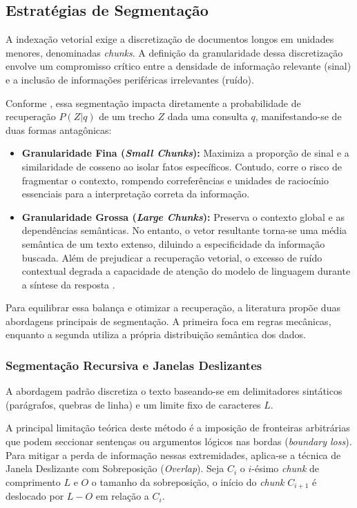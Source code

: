 \subsection{Estratégias de Segmentação}

A indexação vetorial exige a discretização de documentos longos em unidades menores, denominadas \textit{chunks}. A definição da granularidade dessa discretização envolve um compromisso crítico entre a densidade de informação relevante (sinal) e a inclusão de informações periféricas irrelevantes (ruído).

Conforme \citet{zhang2024_chunking}, essa segmentação impacta diretamente a probabilidade de recuperação $P(Z|q)$ de um trecho $Z$ dada uma consulta $q$, manifestando-se de duas formas antagônicas:

\begin{itemize}
  \item \textbf{Granularidade Fina (\textit{Small Chunks}):} Maximiza a proporção de sinal e a similaridade de cosseno ao isolar fatos específicos. Contudo, corre o risco de fragmentar o contexto, rompendo correferências e unidades de raciocínio essenciais para a interpretação correta da informação.
  \item \textbf{Granularidade Grossa (\textit{Large Chunks}):} Preserva o contexto global e as dependências semânticas. No entanto, o vetor resultante torna-se uma média semântica de um texto extenso, diluindo a especificidade da informação buscada. Além de prejudicar a recuperação vetorial, o excesso de ruído contextual degrada a capacidade de atenção do modelo de linguagem durante a síntese da resposta \citep{liu2023lostmiddlelanguagemodels}.
\end{itemize}

Para equilibrar essa balança e otimizar a recuperação, a literatura propõe duas abordagens principais de segmentação. A primeira foca em regras mecânicas, enquanto a segunda utiliza a própria distribuição semântica dos dados.
\subsubsection{Segmentação Recursiva e Janelas Deslizantes}

A abordagem padrão discretiza o texto baseando-se em delimitadores sintáticos (parágrafos, quebras de linha) e um limite fixo de caracteres $L$.

A principal limitação teórica deste método é a imposição de fronteiras arbitrárias que podem seccionar sentenças ou argumentos lógicos nas bordas (\textit{boundary loss}). Para mitigar a perda de informação nessas extremidades, aplica-se a técnica de Janela Deslizante com Sobreposição (\textit{Overlap}). Seja $C_i$ o $i$-ésimo \textit{chunk} de comprimento $L$ e $O$ o tamanho da sobreposição, o início do \textit{chunk} $C_{i+1}$ é deslocado por $L - O$ em relação a $C_i$.

